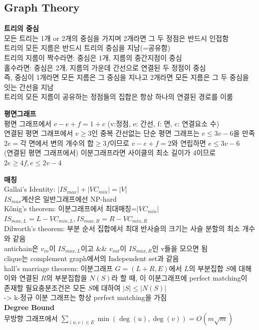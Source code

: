 \subsection{Graph Theory}

\noindent \textbf{트리의 중심} \\
모든 트리는 1개 or 2개의 중심을 가지며 2개라면 그 두 정점은 반드시 인접함 \\
트리의 모든 지름은 반드시 트리의 중심을 지남(=공유함) \\
트리의 지름이 짝수라면: 중심은 1개, 지름의 중간지점이 중심 \\
홀수라면: 중심은 2개, 지름의 가운데 간선으로 연결된 두 정점이 중심 \\
즉, 중심이 1개라면 모든 지름은 그 중심을 지나고 2개라면 모든 지름은 그 두 중심을 잇는 간선을 지남 \\
트리의 모든 지름이 공유하는 정점들의 집합은 항상 하나의 연결된 경로를 이룸

\vspace{5pt}
\noindent \textbf{평면그래프} \\
평면 그래프에서 $v-e+f=1+c$ (v:정점, e: 간선, f: 면, c: 연결요소 수) \\
연결된 평면 그래프에서 $v \ge 3$인 중복 간선없는 단순 평면 그래프는 $e \le 3v-6$을 만족 \\
$2e=$각 면에서 변의 개수의 합$\ge 3f$이므로 $v-e+f=2$와 연립하면 $e \le 3v-6$ \\
(연결된 평면 그래프에서) 이분그래프라면 사이클의 최소 길이가 4이므로 $2e \ge 4f, e \le 2v-4$

\vspace{5pt}
\noindent \textbf{매칭} \\
Gallai's Identity: $|IS_{max}| + |VC_{min}| = |V|$ \\
$IS_{max}$계산은 일반그래프에선 NP-hard \\
Kőnig's theorem: 이분그래프에서 최대매칭=$|VC_{min}|$ \\
$IS_{max,L} = L - VC_{min,L}, IS_{max,R} = R - VC_{min,R}$ \\
Dilworth's theorem: 부분 순서 집합에서 최대 반사슬의 크기는 사슬 분할의 최소 개수와 같음 \\
antichain은 $v_{in}$이 $IS_{max,L}$이고 \&\& $v_{out}$이 $IS_{max, R}$인 v들을 모으면 됨 \\
clique는 complement graph에서의 Independent set과 같음 \\
hall's marriage theorem: 이분그래프 $G=(L+R,E)$에서 $L$의 부분집합 $S$에 대해 이와 연결된 $R$의 부분집합을 $N(S)$라 할 때, 이 이분그래프에 perfect matching이 존재할 필요충분조건은 모든 $S$에 대하여 $|S| \le |N(S)|$ \\
-> k-정규 이분 그래프는 항상 perfect matching을 가짐 \\

\vspace{5pt}
\noindent \textbf{Degree Bound} \\
무방향 그래프에서 $\displaystyle \sum_{(u,v)\in E} \min(\deg(u), \deg(v)) = O(m\sqrt{m})$ \\